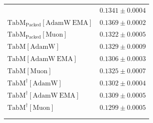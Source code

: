 \begin{longtable}{p{}p{}}
{\begin{tabular}{ll}
{\footnotesize $\mathrm{TabM_{\text{Packed}}[AdamW]}$ } & {\footnotesize$0.1341 \pm 0.0004$}\\ 
{\footnotesize $\mathrm{TabM_{\text{Packed}}[AdamW\ EMA]}$ } & {\footnotesize$0.1369 \pm 0.0002$}\\ 
{\footnotesize $\mathrm{TabM_{\text{Packed}}[Muon]}$ } & {\footnotesize$0.1322 \pm 0.0005$}\\ 
{\footnotesize $\mathrm{TabM[AdamW]}$ } & {\footnotesize$0.1329 \pm 0.0009$}\\ 
{\footnotesize $\mathrm{TabM[AdamW\ EMA]}$ } & {\footnotesize$0.1306 \pm 0.0003$}\\ 
{\footnotesize $\mathrm{TabM[Muon]}$ } & {\footnotesize$0.1325 \pm 0.0007$}\\ 
{\footnotesize $\mathrm{TabM^\dagger[AdamW]}$ } & {\footnotesize$0.1302 \pm 0.0004$}\\ 
{\footnotesize $\mathrm{TabM^\dagger[AdamW\ EMA]}$ } & {\footnotesize$0.1309 \pm 0.0005$}\\ 
{\footnotesize $\mathrm{TabM^\dagger[Muon]}$ } & {\footnotesize$0.1299 \pm 0.0005$}\\ 
\bottomrule
\end{tabular}}

\\
\topalign{
\centering
\setlength\tabcolsep{2.5pt}
\renewcommand{\arraystretch}{0.8}
\begin{tabular}{ll}


\end{tabular}}
\end{longtable}
